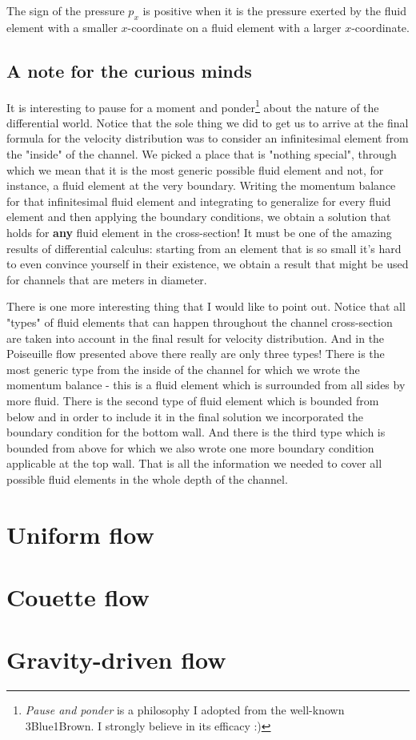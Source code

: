 \documentclass[10pt,twocolumn]{article}
\begin{document}
The sign of the pressure $p_x$ is positive when it is the pressure exerted by the fluid element with a smaller $x$-coordinate on a fluid element with a larger  $x$-coordinate.




\subsection{A note for the curious minds}

It is interesting to pause for a moment and ponder\footnote{\textit{Pause and ponder} is a philosophy I adopted from the well-known 3Blue1Brown. I strongly believe in its efficacy :)} about the nature of the differential world. Notice that the sole thing we did to get us to arrive at the final formula for the velocity distribution was to consider an infinitesimal element from the "inside" of the channel. We picked a place that is "nothing special", through which we mean that it is the most generic possible fluid element and not, for instance, a fluid element at the very boundary. Writing the momentum balance for that infinitesimal fluid element and integrating to generalize for every fluid element and then applying the boundary conditions, we obtain a solution that holds for \textbf{any} fluid element in the cross-section! It must be one of the amazing results of differential calculus: starting from an element that is so small it's hard to even convince yourself in their existence, we obtain a result that might be used for channels that are meters in diameter.

There is one more interesting thing that I would like to point out. Notice that all "types" of fluid elements that can happen throughout the channel cross-section are taken into account in the final result for velocity distribution. And in the Poiseuille flow presented above there really are only three types! There is the most generic type from the inside of the channel for which we wrote the momentum balance - this is a fluid element which is surrounded from all sides by more fluid. There is the second type of fluid element which is bounded from below and in order to include it in the final solution we incorporated the boundary condition for the bottom wall. And there is the third type which is bounded from above for which we also wrote one more boundary condition applicable at the top wall. That is all the information we needed to cover all possible fluid elements in the whole depth of the channel.



\section{Uniform flow}




\section{Couette flow}



\section{Gravity-driven flow}


\begin{thebibliography}{3}

\item 

\end{thebibliography}
\end{document}
